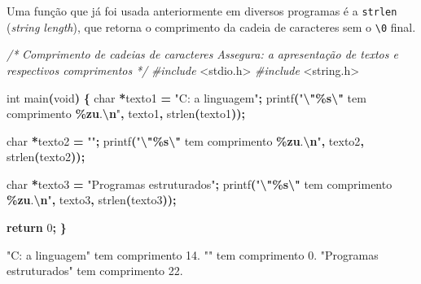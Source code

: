 \documentclass[
  11pt,
  a4paper,
]{scrbook}
\newenvironment{Shaded}{\begin{snugshade}}{\end{snugshade}}
\newcommand{\CommentTok}[1]{\textcolor[rgb]{0.56,0.35,0.01}{\textit{#1}}}
\newcommand{\ControlFlowTok}[1]{\textcolor[rgb]{0.13,0.29,0.53}{\textbf{#1}}}
\newcommand{\DataTypeTok}[1]{\textcolor[rgb]{0.13,0.29,0.53}{#1}}
\newcommand{\DecValTok}[1]{\textcolor[rgb]{0.00,0.00,0.81}{#1}}
\newcommand{\ImportTok}[1]{#1}
\newcommand{\NormalTok}[1]{#1}
\newcommand{\OperatorTok}[1]{\textcolor[rgb]{0.81,0.36,0.00}{\textbf{#1}}}
\newcommand{\PreprocessorTok}[1]{\textcolor[rgb]{0.56,0.35,0.01}{\textit{#1}}}
\newcommand{\SpecialCharTok}[1]{\textcolor[rgb]{0.81,0.36,0.00}{\textbf{#1}}}
\newcommand{\StringTok}[1]{\textcolor[rgb]{0.31,0.60,0.02}{#1}}
\begin{document}
Uma função que já foi usada anteriormente em diversos programas é a
\texttt{strlen} (\emph{string length}), que retorna o comprimento da
cadeia de caracteres sem o \texttt{\textbackslash{}0} final.

\begin{Shaded}
\begin{Highlighting}[]
\CommentTok{/*}
\CommentTok{Comprimento de cadeias de caracteres}
\CommentTok{Assegura: a apresentação de textos e respectivos comprimentos}
\CommentTok{*/}
\PreprocessorTok{\#include }\ImportTok{\textless{}stdio.h\textgreater{}}
\PreprocessorTok{\#include }\ImportTok{\textless{}string.h\textgreater{}}

\DataTypeTok{int}\NormalTok{ main}\OperatorTok{(}\DataTypeTok{void}\OperatorTok{)} \OperatorTok{\{}
    \DataTypeTok{char} \OperatorTok{*}\NormalTok{texto1 }\OperatorTok{=} \StringTok{"C: a linguagem"}\OperatorTok{;}
\NormalTok{    printf}\OperatorTok{(}\StringTok{"}\SpecialCharTok{\textbackslash{}"\%s\textbackslash{}"}\StringTok{ tem comprimento }\SpecialCharTok{\%zu}\StringTok{.}\SpecialCharTok{\textbackslash{}n}\StringTok{"}\OperatorTok{,}\NormalTok{ texto1}\OperatorTok{,}\NormalTok{ strlen}\OperatorTok{(}\NormalTok{texto1}\OperatorTok{));}

    \DataTypeTok{char} \OperatorTok{*}\NormalTok{texto2 }\OperatorTok{=} \StringTok{""}\OperatorTok{;}
\NormalTok{    printf}\OperatorTok{(}\StringTok{"}\SpecialCharTok{\textbackslash{}"\%s\textbackslash{}"}\StringTok{ tem comprimento }\SpecialCharTok{\%zu}\StringTok{.}\SpecialCharTok{\textbackslash{}n}\StringTok{"}\OperatorTok{,}\NormalTok{ texto2}\OperatorTok{,}\NormalTok{ strlen}\OperatorTok{(}\NormalTok{texto2}\OperatorTok{));}

    \DataTypeTok{char} \OperatorTok{*}\NormalTok{texto3 }\OperatorTok{=} \StringTok{"Programas estruturados"}\OperatorTok{;}
\NormalTok{    printf}\OperatorTok{(}\StringTok{"}\SpecialCharTok{\textbackslash{}"\%s\textbackslash{}"}\StringTok{ tem comprimento }\SpecialCharTok{\%zu}\StringTok{.}\SpecialCharTok{\textbackslash{}n}\StringTok{"}\OperatorTok{,}\NormalTok{ texto3}\OperatorTok{,}\NormalTok{ strlen}\OperatorTok{(}\NormalTok{texto3}\OperatorTok{));}

    \ControlFlowTok{return} \DecValTok{0}\OperatorTok{;}
\OperatorTok{\}}
\end{Highlighting}
\end{Shaded}

\begin{Shaded}
\begin{Highlighting}[]
\NormalTok{"C: a linguagem" tem comprimento 14.}
\NormalTok{"" tem comprimento 0.}
\NormalTok{"Programas estruturados" tem comprimento 22.}
\end{Highlighting}
\end{Shaded}
\end{document}
